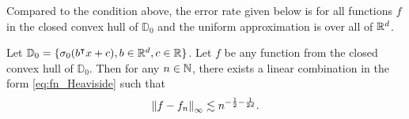 Compared to the condition above, the error rate given below is for all functions
$f$ in the closed convex hull of $\mathbb{D}_0$ and the uniform approximation is
over all of $\mathbb{R}^d$.

\begin{theorem}\cite[Theorem 4, p. 45]{maUniformApproximationRates2022} 
    
    Let $\mathbb{D}_0 = \{\sigma_0(b{}^{\intercal} x+c), b\in\mathbb{R}^d, c\in\mathbb{R}\}$. Let $f$ be
    any function from the closed convex hull of $\mathbb{D}_0$.  Then for any $n
    \in \mathbb{N}$, there exists a linear combination in the form
    \eqref{eq:fn_Heaviside} such that
    \begin{equation}
        \left\| f - f_n \right\|_{\infty} \lesssim 
        n^{-\frac{1}{2} - \frac{1}{2d}}.
    \end{equation}

\end{theorem}


